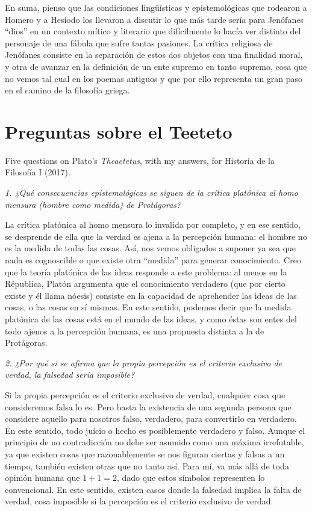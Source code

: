 En suma, pienso que las condiciones
lingüísticas y epistemológicas que rodearon a
Homero y a Hesíodo los llevaron a discutir lo
que más tarde sería para Jenófanes ``dios''
en un contexto mítico y literario que
difícilmente lo hacía ver distinto del
personaje de una fábula que sufre tantas
pasiones. La crítica religiosa de Jenófanes
consiste en la separación de estos dos
objetos con una finalidad moral, y otra de
avanzar en la definición de un ente supremo
en tanto supremo, cosa que no vemos tal cual
en los poemas antiguos y que por ello
representa un gran paso en el camino de la
filosofía griega.

\section{Preguntas sobre el Teeteto}
\label{section-teeteto}

Five questions on Plato's
\emph{Theaetetus}, with my answers, for
Historia de la Filosofía I (2017).

\medskip\noindent\emph{1. ¿Qué consecuencias
epistemológicas se siguen de la crítica
platónica al homo mensura (hombre como
medida) de Protágoras?}

La crítica platónica al homo mensura lo
invalida por completo, y en ese sentido, se
desprende de ella que la verdad es ajena a la
percepción humana: el hombre no es la medida
de todas las cosas. Así, nos vemos obligados
a suponer ya sea que nada es cognoscible o
que existe otra ``medida'' para generar
conocimiento. Creo que la teoría platónica de
las ideas responde a este problema: al menos
en la Républica, Platón argumenta que el
conocimiento verdadero (que por cierto existe
y él llama nóesis) consiste en la capacidad
de aprehender las ideas de las cosas, o las
cosas en sí mismas. En este sentido, podemos
decir que la medida platónica de las cosas
está en el mundo de las ideas, y como éstas
son entes del todo ajenos a la percepción
humana, es una propuesta distinta a la de
Protágoras.

\medskip\noindent\emph{2. ¿Por qué si se
afirma que la propia percepción es el
criterio exclusivo de verdad, la falsedad
sería imposible?}

Si la propia percepción es el criterio
exclusivo de verdad, cualquier cosa que
consideremos falsa lo es. Pero basta la
existencia de una segunda persona que
considere aquello para nosotros falso,
verdadero, para convertirlo en verdadero. En
este sentido, todo juicio o hecho es
posiblemente verdadero y falso. Aunque el
principio de no contradicción no debe ser
asumido como una máxima irrefutable, ya que
existen cosas que razonablemente se nos
figuran ciertas y falsas a un tiempo, también
existen otras que no tanto así. Para mí, va
más allá de toda opinión humana que $1+1=2$,
dado que estos símbolos representen lo
convencional. En este sentido, existen casos
donde la falsedad implica la falta de verdad,
cosa imposible si la percepción es el
criterio exclusivo de verdad.

